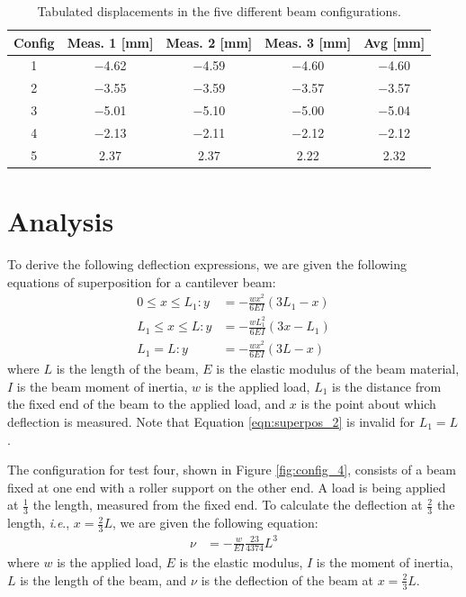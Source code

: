 \documentclass[12 pt]{article}
\newcommand{\ie}{\textit{i}.\textit{e}., }
\begin{document}
\begin{table}[!htbp]
\caption{Tabulated displacements in the five different beam configurations.}
\begin{center}
	\begin{tabular}{|c|c|c|c|c|}
		\hline
		Config&Meas. 1 [\unit{\mm}]&Meas. 2 [\unit{\mm}]&Meas. 3 [\unit{\mm}]&Avg [\unit{\mm}]\\
		\hline
		\num{1}&\num{-4.62}&\num{-4.59}&\num{-4.60}&\num{-4.60}\\
		\hline
		\num{2}&\num{-3.55}&\num{-3.59}&\num{-3.57}&\num{-3.57}\\
		\hline
		\num{3}&\num{-5.01}&\num{-5.10}&\num{-5.00}&\num{-5.04}\\
		\hline
		\num{4}&\num{-2.13}&\num{-2.11}&\num{-2.12}&\num{-2.12}\\
		\hline
		\num{5}&\num{2.37}&\num{2.37}&\num{2.22}&\num{2.32}\\
		\hline
	\end{tabular}
\end{center}
\label{tbl:data}
\end{table}

\section{Analysis} \label{analysis}
To derive the following deflection expressions, we are given the following equations of superposition for a cantilever beam:
\begin{align}
	0\le{}x\le{}L_1:y&=-\frac{wx^2}{6EI}(3L_1-x)\label{eqn:superpos_1}\\
	L_1\le{}x\le{}L:y&=-\frac{wL_1^2}{6EI}(3x-L_1)\label{eqn:superpos_2}\\
	L_1=L:y&=-\frac{wx^2}{6EI}(3L-x)\label{eqn:superpos_3}
\end{align}
where $L$ is the length of the beam, $E$ is the elastic modulus of the beam material, $I$ is the beam moment of inertia, $w$ is the applied load, $L_1$ is the distance from the fixed end of the beam to the applied load, and $x$ is the point about which deflection is measured. Note that Equation \ref{eqn:superpos_2} is invalid for $L_1=L$.

The configuration for test four, shown in Figure \ref{fig:config_4}, consists of a beam fixed at one end with a roller support on the other end. A load is being applied at $\frac{1}{3}$ the length, measured from the fixed end. To calculate the deflection at $\frac{2}{3}$ the length, \ie $x=\frac{2}{3}L$, we are given the following equation:
\begin{align} \label{eqn:config_4-deflection}
	\nu&=-\frac{w}{EI}\frac{23}{4374}L^3
\end{align}
where $w$ is the applied load, $E$ is the elastic modulus, $I$ is the moment of inertia, $L$ is the length of the beam, and $\nu$ is the deflection of the beam at $x=\frac{2}{3}L$.
\end{document}
